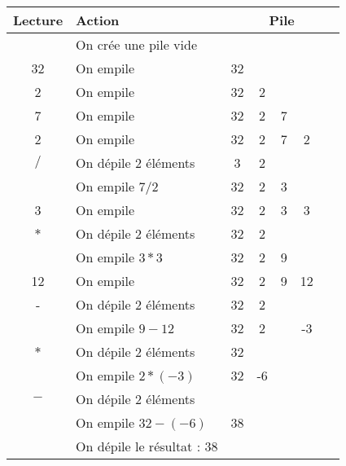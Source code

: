 \begin{center}
\begin{tabular}{|c|l|ccccc|}
Lecture&Action&\multicolumn{5}{c}{Pile}\\
\hline
&On crée une pile vide & & & & & \\
\hline
32&On empile & 32 & & & & \\
2&On empile & 32 &2 & & & \\
7&On empile & 32 &2 &7 & & \\
2&On empile & 32 &2 &7 &2 &\ \\
$/$&On dépile 2 éléments& 3 &2 & & &\ \\
&On empile $7/2$& 32 &2 &3 & &\ \\
3&On empile & 32 &2 &3 &3 &\ \\
$*$&On dépile 2 éléments& 32 &2 & & &\ \\
&On empile $3*3$& 32 &2 &9 & &\ \\
12&On empile & 32 &2 &9 &12 &\ \\
-&On dépile 2 éléments& 32 &2 & & &\ \\
&On empile $9-12$& 32 &2 & &-3 &\ \\
$*$&On dépile 2 éléments&32 & & & &\ \\
&On empile $2*(-3)$&32 &-6 & & &\ \\
$-$&On dépile 2 éléments& & & & &\ \\
&On empile $32-(-6)$&38 & & & &\ \\
\hline
&On dépile le résultat : 38& & & & &\ \\
\hline
\end{tabular}
\end{center}

